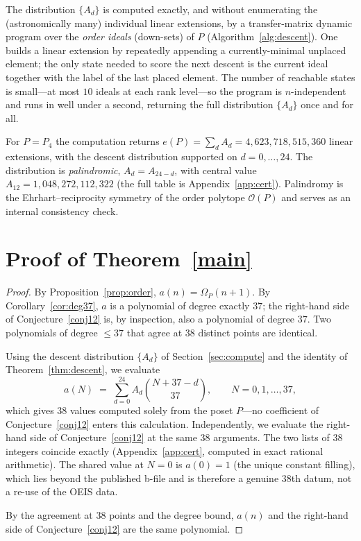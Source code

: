 \documentclass[11pt]{article}
\theoremstyle{plain}
\theoremstyle{definition}
\theoremstyle{remark}
\newcommand{\Om}{\Omega}
\begin{document}
The distribution $\{A_d\}$ is computed exactly, and without enumerating the (astronomically
many) individual linear extensions, by a transfer-matrix dynamic program over the \emph{order
ideals} (down-sets) of $P$ (Algorithm~\ref{alg:descent}). One builds a linear extension by
repeatedly appending a currently-minimal unplaced element; the only state needed to score the
next descent is the current ideal together with the label of the last placed element. The
number of reachable states is small---at most $10$ ideals at each rank level---so the program
is $n$-independent and runs in well under a second, returning the full distribution $\{A_d\}$
once and for all.

For $P=P_4$ the computation returns $e(P)=\sum_d A_d=4{,}623{,}718{,}515{,}360$ linear
extensions, with the descent distribution supported on $d=0,\dots,24$. The distribution is
\emph{palindromic}, $A_d=A_{24-d}$, with central value $A_{12}=1{,}048{,}272{,}112{,}322$ (the
full table is Appendix~\ref{app:cert}). Palindromy is the Ehrhart--reciprocity symmetry of the
order polytope $\mathcal O(P)$ and serves as an internal consistency check.

\section{Proof of Theorem~\ref{main}}\label{sec:proof}

\begin{proof}
By Proposition~\ref{prop:order}, $a(n)=\Om_P(n+1)$. By Corollary~\ref{cor:deg37}, $a$ is a
polynomial of degree exactly $37$; the right-hand side of Conjecture~\ref{conj12} is, by
inspection, also a polynomial of degree $37$. Two polynomials of degree $\le 37$ that agree at
$38$ distinct points are identical.

Using the descent distribution $\{A_d\}$ of Section~\ref{sec:compute} and the identity of
Theorem~\ref{thm:descent}, we evaluate
\[
  a(N)\;=\;\sum_{d=0}^{24} A_d\binom{N+37-d}{37},\qquad N=0,1,\dots,37,
\]
which gives $38$ values computed solely from the poset $P$---no coefficient of
Conjecture~\ref{conj12} enters this calculation. Independently, we evaluate the right-hand side
of Conjecture~\ref{conj12} at the same $38$ arguments. The two lists of $38$ integers coincide
exactly (Appendix~\ref{app:cert}, computed in exact rational arithmetic). The shared value at
$N=0$ is $a(0)=1$ (the unique constant filling), which lies beyond the published b-file and is
therefore a genuine $38$th datum, not a re-use of the OEIS data.

By the agreement at $38$ points and the degree bound, $a(n)$ and the right-hand side of
Conjecture~\ref{conj12} are the same polynomial.
\end{proof}
\end{document}
